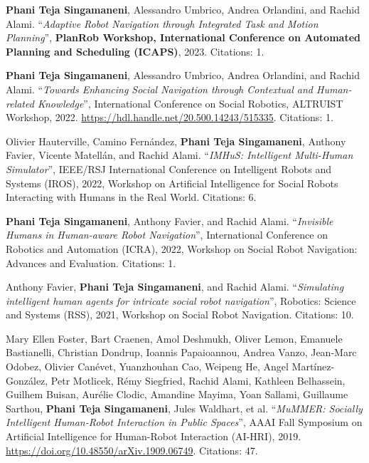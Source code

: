 \documentclass[11pt]{article}
\newcounter{descenum}
\newenvironment{descenumerate}[2]{%
  \setcounter{descenum}{#2}%
  \begin{enumerate}[
    topsep=0pt,
    itemsep=3pt,
    partopsep=0pt,
    parsep=0pt,
    label={[#1\arabic{descenum}]}
  ]
}{
  \end{enumerate}
}
\newcommand{\descitem}{%
  \item
  \addtocounter{descenum}{-1}
}
\newcommand{\bt}[1]{{\textbf{\color{teal} #1}}}
\newcommand{\boldheading}[1]{\par\vspace{4pt}{\bfseries #1\par}\vspace{2pt}}
\begin{document}
\vspace{6pt}

\boldheading{Workshops and Symposia}
\begin{descenumerate}{W}{6}
   \descitem \label{planrob} {\textbf{Phani Teja Singamaneni}, Alessandro Umbrico, Andrea Orlandini, and Rachid Alami. ``\textit{Adaptive Robot Navigation through Integrated Task and Motion Planning}'', \bt{PlanRob Workshop, International Conference on Automated Planning and Scheduling (ICAPS)}, 2023.} Citations: 1.

    \descitem {\textbf{Phani Teja Singamaneni}, Alessandro Umbrico, Andrea Orlandini, and Rachid Alami. ``\textit{Towards Enhancing Social Navigation through Contextual and Human-related Knowledge}'', International Conference on Social Robotics, ALTRUIST Workshop, 2022. \url{https://hdl.handle.net/20.500.14243/515335}.} Citations: 1.

    \descitem \label{imhus2} {Olivier Hauterville, Camino Fernández, \textbf{Phani Teja Singamaneni}, Anthony Favier, Vicente Matellán, and Rachid Alami. 
    ``\textit{IMHuS: Intelligent Multi-Human Simulator}'', IEEE/RSJ International Conference on Intelligent Robots and Systems (IROS), 2022, Workshop on Artificial Intelligence for Social Robots Interacting with Humans in the Real World.} Citations: 6.

    \descitem \label{invisible22} {\textbf{Phani Teja Singamaneni}, Anthony Favier, and Rachid Alami. ``\textit{Invisible Humans in Human-aware Robot Navigation}'', International Conference on Robotics and Automation (ICRA), 2022, Workshop on Social Robot Navigation: Advances and Evaluation.} Citations: 1.

    \descitem \label{inhus2} {Anthony Favier, \textbf{Phani Teja Singamaneni}, and Rachid Alami. ``\textit{Simulating intelligent human agents for intricate social robot navigation}'', Robotics: Science and Systems (RSS), 2021, Workshop on Social Robot Navigation.} Citations: 10.

    \descitem \label{mummer19} {Mary Ellen Foster, Bart Craenen, Amol Deshmukh, Oliver Lemon, Emanuele Bastianelli, Christian Dondrup, Ioannis Papaioannou, Andrea Vanzo, Jean-Marc Odobez, Olivier Canévet, Yuanzhouhan Cao, Weipeng He, Angel Martínez-González, Petr Motlicek, Rémy Siegfried, Rachid Alami, Kathleen Belhassein, Guilhem Buisan, Aurélie Clodic, Amandine Mayima, Yoan Sallami, Guillaume Sarthou, \textbf{Phani Teja Singamaneni}, Jules Waldhart, et al. ``\textit{MuMMER: Socially Intelligent Human-Robot Interaction in Public Spaces}'', AAAI Fall Symposium on Artificial Intelligence for Human-Robot Interaction (AI-HRI), 2019. \url{https://doi.org/10.48550/arXiv.1909.06749}.} Citations: 47.
 \end{descenumerate}
\end{document}
